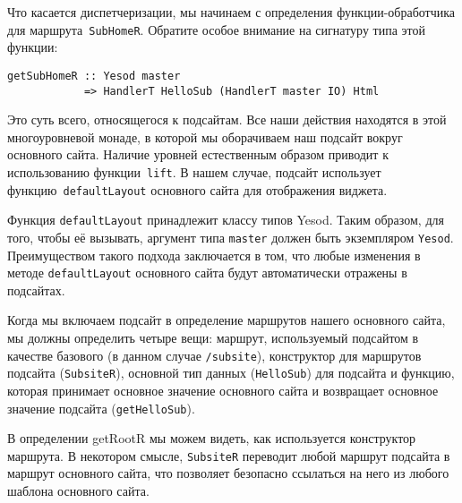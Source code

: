 Что касается диспетчеризации, мы начинаем с определения функции-обработчика для маршрута~\lstinline'SubHomeR'. Обратите особое внимание на сигнатуру типа этой функции:
\begin{lstlisting}
getSubHomeR :: Yesod master
            => HandlerT HelloSub (HandlerT master IO) Html
\end{lstlisting}

Это суть всего, относящегося к подсайтам. Все наши действия находятся в этой многоуровневой монаде, в которой мы оборачиваем наш подсайт вокруг основного сайта. Наличие уровней естественным образом приводит к использованию функции~\lstinline'lift'. В нашем случае, подсайт использует функцию~\lstinline'defaultLayout' основного сайта для отображения виджета.

Функция \lstinline!defaultLayout! принадлежит классу типов Yesod. Таким образом, для того, чтобы её вызывать, аргумент типа \lstinline!master! должен быть экземпляром \lstinline!Yesod!.  Преимуществом такого подхода заключается в том, что любые изменения в методе \lstinline!defaultLayout! основного сайта будут автоматически отражены в подсайтах.

Когда мы включаем подсайт в определение маршрутов нашего основного сайта, мы должны определить четыре вещи: маршрут, используемый подсайтом в качестве базового (в данном случае \lstinline!/subsite!), конструктор для маршрутов подсайта (\lstinline!SubsiteR!), основной тип данных (\lstinline!HelloSub!) для подсайта и функцию, которая принимает основное значение основного сайта и возвращает основное значение подсайта (\lstinline!getHelloSub!).

В определении getRootR мы можем видеть, как используется конструктор маршрута. В некотором смысле, \lstinline!SubsiteR! переводит любой маршрут подсайта в маршрут основного сайта, что позволяет безопасно ссылаться на него из любого шаблона основного сайта.
